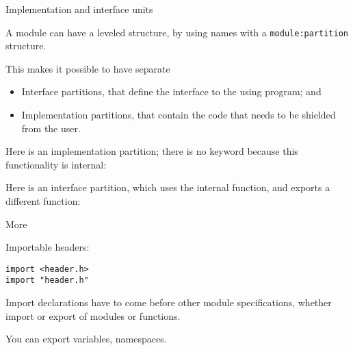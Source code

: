  {Implementation and interface units}

A module can have a leveled structure, by using names with a
\lstinline{module:partition} structure.

This makes it possible to have separate
\begin{itemize}
\item Interface partitions, that define the interface to the using program; and
\item Implementation partitions, that contain the code that needs to
  be shielded from the user.
\end{itemize}

Here is an implementation partition; there is no  keyword
because this functionality is internal:
%

Here is an interface partition, which uses the internal function,
and exports a different function:
%


 {More}

Importable headers:
\begin{lstlisting}
import <header.h>
import "header.h"
\end{lstlisting}

Import declarations have to come before other module specifications,
whether import or export of modules or functions.

You can export variables, namespaces.
